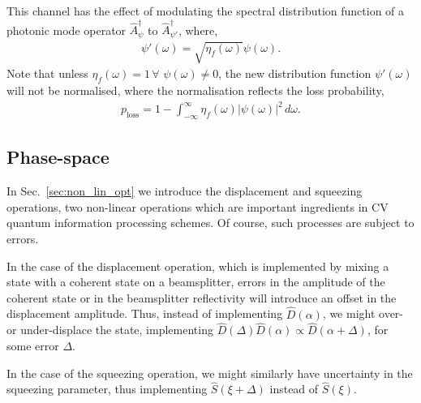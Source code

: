 This channel has the effect of modulating the spectral distribution function of a photonic mode operator $\hat{A}_\psi^\dag$ to $\hat{A}_{\psi'}^\dag$, where,
\begin{align}
\psi'(\omega) = \sqrt{\eta_f(\omega)}\psi(\omega).	
\end{align}
Note that unless \mbox{$\eta_f(\omega)=1\,\forall\,\,\psi(\omega)\neq 0$}, the new distribution function $\psi'(\omega)$ will not be normalised, where the normalisation reflects the loss probability,
\begin{align}
p_\mathrm{loss} = 1 - \int_{-\infty}^\infty \eta_f(\omega)|\psi(\omega)|^2\,d\omega.
\end{align}

%
%

\subsection{Phase-space} 

In Sec.~\ref{sec:non_lin_opt} we introduce the displacement and squeezing operations, two non-linear operations which are important ingredients in CV quantum information processing schemes. Of course, such processes are subject to errors.

In the case of the displacement operation, which is implemented by mixing a state with a coherent state on a beamsplitter, errors in the amplitude of the coherent state or in the beamsplitter reflectivity will introduce an offset in the displacement amplitude. Thus, instead of implementing $\hat{D}(\alpha)$, we might over- or under-displace the state, implementing \mbox{$\hat{D}(\Delta)\hat{D}(\alpha)\propto \hat{D}(\alpha+\Delta)$}, for some error $\Delta$.

In the case of the squeezing operation, we might similarly have uncertainty in the squeezing parameter, thus implementing $\hat{S}(\xi+\Delta)$ instead of $\hat{S}(\xi)$.